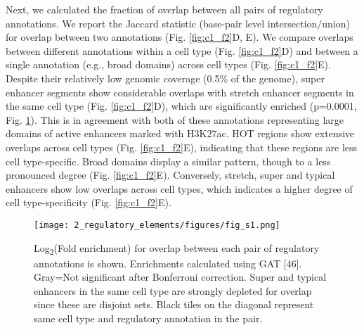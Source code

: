 Next, we calculated the fraction of overlap between all pairs of regulatory annotations. We report the Jaccard statistic (base-pair level intersection/union) for overlap between two annotations (Fig. \ref{fig:c1_f2}D, E). We compare overlaps between different annotations within a cell type (Fig. \ref{fig:c1_f2}D) and between a single annotation (e.g., broad domains) across cell types (Fig. \ref{fig:c1_f2}E). Despite their relatively low genomic coverage (0.5\% of the genome), super enhancer segments show considerable overlaps with stretch enhancer segments in the same cell type (Fig. \ref{fig:c1_f2}D), which are significantly enriched (p=0.0001, Fig. \ref{fig:c1_fs1}). This is in agreement with both of these annotations representing large domains of active enhancers marked with H3K27ac. HOT regions show extensive overlaps across cell types (Fig. \ref{fig:c1_f2}E), indicating that these regions are less cell type-specific. Broad domains display a similar pattern, though to a less pronounced degree (Fig. \ref{fig:c1_f2}E). Conversely, stretch, super and typical enhancers show low overlaps across cell types, which indicates a higher degree of cell type-specificity (Fig. \ref{fig:c1_f2}E). \\

\begin{figure}
    \centering
    \texttt{[image: 2\_regulatory\_elements/figures/fig\_s1.png]}
    \caption{Log\textsubscript{2}(Fold enrichment) for overlap between each pair of regulatory annotations is shown. Enrichments calculated using GAT [46]. Gray=Not significant after Bonferroni correction. Super and typical enhancers in the same cell type are strongly depleted for overlap since these are disjoint sets. Black tiles on the diagonal represent same cell type and regulatory annotation in the pair.}
    \label{fig:c1_fs1}
\end{figure}


